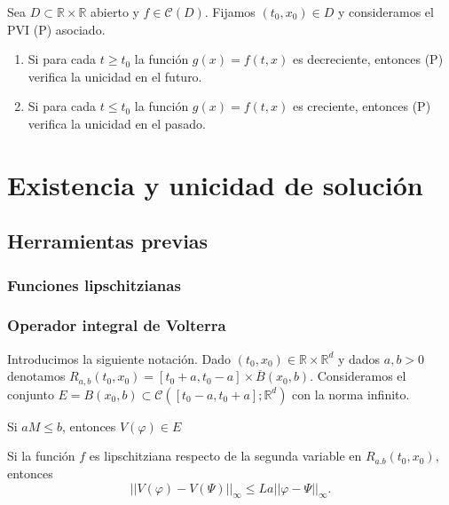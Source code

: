 \documentclass{article}
\begin{document}
\begin{thm}
  Sea $D \subset \mathbb{R} \times \mathbb{R}$ abierto y
  $f \in \mathcal{C}(D)$. Fijamos $(t_0, x_0) \in D$ y consideramos el
  PVI (P) asociado.
  \begin{enumerate}
  \item\label{item:peano:a} Si para cada $t \ge t_0$ la función
    $g(x) = f(t,x)$ es decreciente, entonces (P) verifica la unicidad
    en el futuro.
  \item\label{item:peano:b} Si para cada $t \le t_0$ la función
    $g(x) = f(t,x)$ es creciente, entonces (P) verifica la unicidad en
    el pasado.
  \end{enumerate}
\end{thm}

\section{Existencia y unicidad de solución} \label{sec:eu}

\subsection{Herramientas previas}

\subsubsection{Funciones lipschitzianas}

\subsubsection{Operador integral de Volterra}

Introducimos la siguiente notación. Dado $(t_0, x_0) \in \mathbb{R} \times \mathbb{R}^d$ y dados
$a,b > 0$ denotamos $R_{a,b}(t_0, x_0) = [t_0+a, t_0-a] \times \overline{B}(x_0, b)$. Consideramos
el conjunto $E = B(x_0, b) \subset \mathcal{C}([t_0-a, t_0+a]; \mathbb{R}^d)$ con la norma infinito.

\begin{lem}
  Si $aM \le b$, entonces $V(\varphi) \in E$
\end{lem}

\begin{lem}
  Si la función $f$ es lipschitziana respecto de la segunda variable en $R_{a.b}(t_0, x_0)$,
  entonces
  \[||V(\varphi) - V(\Psi)||_{\infty} \le La||\varphi - \Psi||_\infty.\]
\end{lem}
\end{document}
